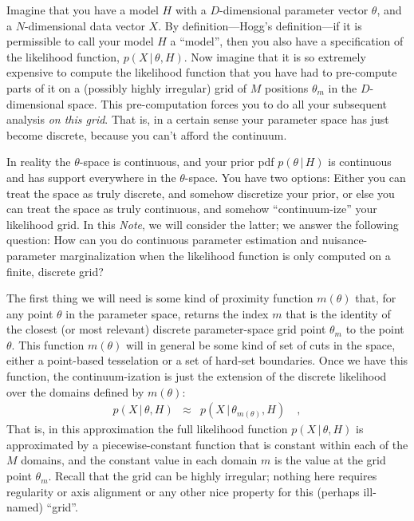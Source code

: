 \documentclass[12pt]{article}
\newcommand{\documentname}{\textsl{Note}}
\newcommand{\given}{\,|\,}
\begin{document}
Imagine that you have a model $H$ with a $D$-dimensional parameter vector $\theta$,
and a $N$-dimensional data vector $X$.
By definition---Hogg's definition---if it is permissible to call your model $H$
a ``model'', then you also have a specification of the likelihood function,
$p(X\given\theta, H)$.
Now imagine that it is so extremely expensive to compute the likelihood function that
you have had to pre-compute parts of it on a (possibly highly irregular)
grid of $M$ positions $\theta_m$ in the $D$-dimensional space.
This pre-computation forces you to do all your subsequent analysis
\emph{on this grid}.
That is, in a certain sense your parameter space has just become discrete,
because you can't afford the continuum.

In reality the $\theta$-space is continuous, and your prior pdf $p(\theta\given H)$
is continuous and has support everywhere in the $\theta$-space.
You have two options:
Either you can treat the space as truly discrete, and somehow discretize your prior,
or else you can treat the space as truly continuous, and somehow ``continuum-ize'' your likelihood grid.
In this \documentname, we will consider the latter; we answer the following question:
How can you do continuous parameter estimation and nuisance-parameter marginalization
when the likelihood function is only computed on a finite, discrete grid?

The first thing we will need is some kind of proximity function
$m(\theta)$ that, for any point $\theta$ in the parameter space,
returns the index $m$ that is the identity of the closest (or most
relevant) discrete parameter-space grid point $\theta_m$ to the point
$\theta$.  This function $m(\theta)$ will in general be some kind of
set of cuts in the space, either a point-based tesselation or a set of
hard-set boundaries.  Once we have this function, the
continuum-ization is just the extension of the discrete likelihood
over the domains defined by $m(\theta)$:
\begin{eqnarray}
p(X\given\theta, H)
 &\approx&
p(X\given\theta_{m(\theta)}, H)
\quad ,
\end{eqnarray}
That is, in this approximation the full likelihood function
$p(X\given\theta, H)$ is approximated by a piecewise-constant function
that is constant within each of the $M$ domains, and the constant
value in each domain $m$ is the value at the grid point $\theta_m$.
Recall that the grid can be highly irregular; nothing here requires
regularity or axis alignment or any other nice property for this
(perhaps ill-named) ``grid''.
\end{document}
